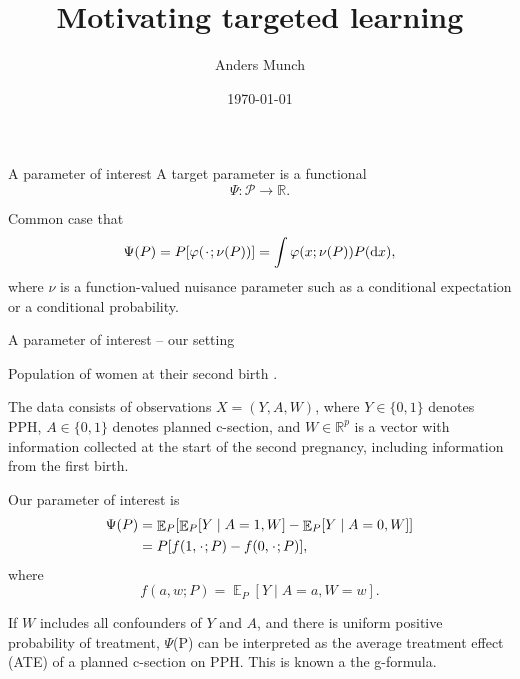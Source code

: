 \documentclass[smaller]{beamer}\usepackage{listings}
\author{Anders Munch}
\date{\today}
\title{Motivating targeted learning}
\newcommand{\E}{{\ensuremath{\mathop{{\mathbb{E}}}}}}
\newcommand{\R}{\mathbb{R}}
\newcommand{\blank}{\makebox[1ex]{\textbf{$\cdot$}}}
\renewcommand{\phi}{\varphi}
\newcommand*\diff{\mathop{}\!\mathrm{d}}
\newcommand{\1}{\mathds{1}}
\begin{document}
\maketitle

\begin{frame}[label={sec:orgb91ed99}]{A parameter of interest}
A target parameter is a functional
\begin{equation*}
  \Psi \colon \mathcal{P} \longrightarrow \R.
\end{equation*}

\vfill

Common case that
\begin{equation*}
  \Psi(P) = P{[ \phi(\blank; \nu(P)) ]}
  = \int \phi(x; \nu(P)) P(\diff x),
\end{equation*}
where $\nu$ is a function-valued nuisance parameter such as a conditional expectation or
a conditional probability.
\end{frame}


\begin{frame}[label={sec:org48a3d5e}]{A parameter of interest -- our setting}
\small

Population of women at their second birth \citep{wikkelso2014prediction}.

\vfill

The data consists of observations \( X = (Y, A, W) \), where \( Y \in \{0,1\}\) denotes PPH,
\( A \in \{0,1\} \) denotes planned c-section, and \( W \in \R^p \) is a vector
with information collected at the start of the second pregnancy, including
information from the first birth.

\vfill

Our parameter of interest is
\begin{align*}
  \Psi(P)
  & =
    \E_P
    {\left[
    \E_P{\left[ Y \mid A=1, W  \right]}
    - \E_P{\left[ Y \mid A=0, W  \right]}
    \right]}
  \\
  & = 
    P{[f(1, \blank; P) - f(0, \blank; P)]}    ,
\end{align*}
where
\begin{equation*}
  f(a, w; P) = \E_P{\left[ Y \mid A=a, W=w  \right]}.
\end{equation*}

\vfill

If \color{bblue}\(W\) includes all confounders of \(Y\) and \(A\)\color{black},
and there is \color{bblue}uniform positive probability of
treatment\color{black}, \(\Psi\)(P) can be interpreted as the average treatment
effect (ATE) of a planned c-section on PPH. This is known a the g-formula.
\end{frame}
\end{document}
